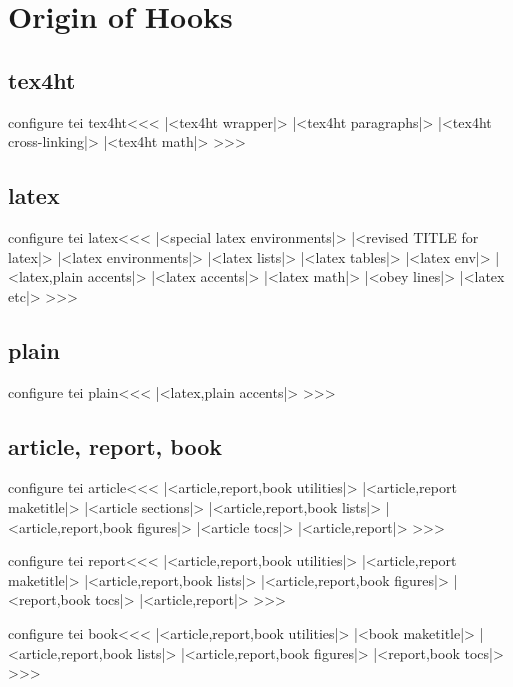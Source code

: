 \chapter{Origin of Hooks}

\section{tex4ht}

\<configure tei tex4ht\><<<    
|<tex4ht wrapper|>
|<tex4ht paragraphs|>
|<tex4ht cross-linking|>
|<tex4ht math|>
>>>



\section{latex}

\<configure tei latex\><<< 
|<special latex environments|>
|<revised TITLE for latex|>
|<latex environments|>
|<latex lists|>
|<latex tables|>
|<latex env|>
|<latex,plain accents|>
|<latex accents|>
|<latex math|>
|<obey lines|>
|<latex etc|>
>>>




\section{plain}

\<configure tei plain\><<< 
|<latex,plain accents|>
>>>


\section{article, report, book}

\<configure tei article\><<< 
|<article,report,book utilities|>
|<article,report maketitle|>
|<article sections|>
|<article,report,book lists|>
|<article,report,book figures|>
|<article tocs|>
|<article,report|>
>>>


\<configure tei report\><<< 
|<article,report,book utilities|>
|<article,report maketitle|>
|<article,report,book lists|>
|<article,report,book figures|>
|<report,book tocs|>
|<article,report|>
>>>



\<configure tei book\><<< 
|<article,report,book utilities|>
|<book maketitle|>
|<article,report,book lists|>
|<article,report,book figures|>
|<report,book tocs|>
>>>


